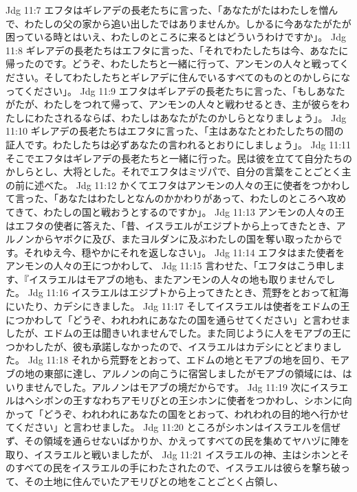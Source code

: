 Jdg 11:7  エフタはギレアデの長老たちに言った、「あなたがたはわたしを憎んで、わたしの父の家から追い出したではありませんか。しかるに今あなたがたが困っている時とはいえ、わたしのところに来るとはどういうわけですか」。
Jdg 11:8  ギレアデの長老たちはエフタに言った、「それでわたしたちは今、あなたに帰ったのです。どうぞ、わたしたちと一緒に行って、アンモンの人々と戦ってください。そしてわたしたちとギレアデに住んでいるすべてのものとのかしらになってください」。
Jdg 11:9  エフタはギレアデの長老たちに言った、「もしあなたがたが、わたしをつれて帰って、アンモンの人々と戦わせるとき、主が彼らをわたしにわたされるならば、わたしはあなたがたのかしらとなりましょう」。
Jdg 11:10  ギレアデの長老たちはエフタに言った、「主はあなたとわたしたちの間の証人です。わたしたちは必ずあなたの言われるとおりにしましょう」。
Jdg 11:11  そこでエフタはギレアデの長老たちと一緒に行った。民は彼を立てて自分たちのかしらとし、大将とした。それでエフタはミヅパで、自分の言葉をことごとく主の前に述べた。
Jdg 11:12  かくてエフタはアンモンの人々の王に使者をつかわして言った、「あなたはわたしとなんのかかわりがあって、わたしのところへ攻めてきて、わたしの国と戦おうとするのですか」。
Jdg 11:13  アンモンの人々の王はエフタの使者に答えた、「昔、イスラエルがエジプトから上ってきたとき、アルノンからヤボクに及び、またヨルダンに及ぶわたしの国を奪い取ったからです。それゆえ今、穏やかにそれを返しなさい」。
Jdg 11:14  エフタはまた使者をアンモンの人々の王につかわして、
Jdg 11:15  言わせた、「エフタはこう申します、『イスラエルはモアブの地も、またアンモンの人々の地も取りませんでした。
Jdg 11:16  イスラエルはエジプトから上ってきたとき、荒野をとおって紅海にいたり、カデシにきました。
Jdg 11:17  そしてイスラエルは使者をエドムの王につかわして「どうぞ、われわれにあなたの国を通らせてください」と言わせましたが、エドムの王は聞きいれませんでした。また同じように人をモアブの王につかわしたが、彼も承諾しなかったので、イスラエルはカデシにとどまりました。
Jdg 11:18  それから荒野をとおって、エドムの地とモアブの地を回り、モアブの地の東部に達し、アルノンの向こうに宿営しましたがモアブの領域には、はいりませんでした。アルノンはモアブの境だからです。
Jdg 11:19  次にイスラエルはヘシボンの王すなわちアモリびとの王シホンに使者をつかわし、シホンに向かって「どうぞ、われわれにあなたの国をとおって、われわれの目的地へ行かせてください」と言わせました。
Jdg 11:20  ところがシホンはイスラエルを信ぜず、その領域を通らせないばかりか、かえってすべての民を集めてヤハヅに陣を取り、イスラエルと戦いましたが、
Jdg 11:21  イスラエルの神、主はシホンとそのすべての民をイスラエルの手にわたされたので、イスラエルは彼らを撃ち破って、その土地に住んでいたアモリびとの地をことごとく占領し、

